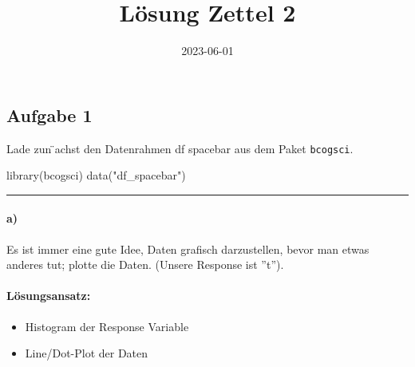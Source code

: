 \documentclass[
]{article}
\title{Lösung Zettel 2}
\author{}
\date{\vspace{-2.5em}2023-06-01}
\newenvironment{Shaded}{\begin{snugshade}}{\end{snugshade}}
\newcommand{\AttributeTok}[1]{\textcolor[rgb]{0.77,0.63,0.00}{#1}}
\newcommand{\CommentTok}[1]{\textcolor[rgb]{0.56,0.35,0.01}{\textit{#1}}}
\newcommand{\DecValTok}[1]{\textcolor[rgb]{0.00,0.00,0.81}{#1}}
\newcommand{\FunctionTok}[1]{\textcolor[rgb]{0.00,0.00,0.00}{#1}}
\newcommand{\NormalTok}[1]{#1}
\newcommand{\SpecialCharTok}[1]{\textcolor[rgb]{0.00,0.00,0.00}{#1}}
\newcommand{\StringTok}[1]{\textcolor[rgb]{0.31,0.60,0.02}{#1}}
\providecommand{\tightlist}{%
  \setlength{\itemsep}{0pt}\setlength{\parskip}{0pt}}
\begin{document}
\maketitle

\hypertarget{aufgabe-1}{%
\subsection{Aufgabe 1}\label{aufgabe-1}}

Lade zun ̈achst den Datenrahmen df spacebar aus dem Paket
\texttt{bcogsci}.

\begin{Shaded}
\begin{Highlighting}[]
\FunctionTok{library}\NormalTok{(bcogsci)}
\FunctionTok{data}\NormalTok{(}\StringTok{"df\_spacebar"}\NormalTok{)}
\end{Highlighting}
\end{Shaded}

\begin{center}\rule{0.5\linewidth}{0.5pt}\end{center}

\hypertarget{a}{%
\paragraph{a)}\label{a}}

Es ist immer eine gute Idee, Daten grafisch darzustellen, bevor man
etwas anderes tut; plotte die Daten. (Unsere Response ist ''t'').

\hypertarget{luxf6sungsansatz}{%
\paragraph{Lösungsansatz:}\label{luxf6sungsansatz}}

\begin{itemize}
\tightlist
\item
  Histogram der Response Variable
\item
  Line/Dot-Plot der Daten
\end{itemize}

\begin{Shaded}
\end{Shaded}
\end{document}

